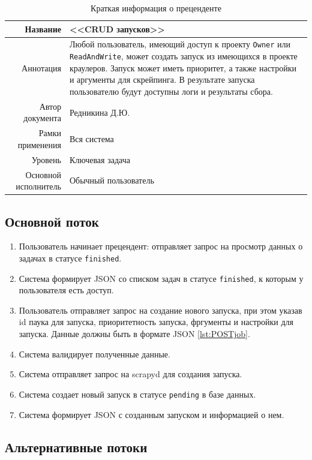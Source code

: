 \documentclass[a4paper,12pt]{article}
\begin{document}
	\begin{longtable}[]{|@{\textbf}r|p{7cm}|} 
    \caption{Краткая информация о преценденте}
    \hline
    Название             & <<CRUD запусков>>   \\ \hline
    Аннотация            & Любой пользователь, имеющий доступ к проекту \texttt{Owner} или \texttt{ReadAndWrite}, может создать запуск из имеющихся в проекте краулеров. Запуск может иметь приоритет, а также настройки и аргументы для скрейпинга. В результате запуска пользователю будут доступны логи и результаты сбора. \\ \hline
    Автор документа      & Редникина Д.Ю.     \\ \hline
    Рамки применения     & Вся система     \\ \hline
    Уровень              & Ключевая задача                     \\ \hline
    Основной исполнитель & Обычный пользователь     \\ \hline
\end{longtable}

\subsection*{Основной поток}

\begin{enumerate}
    \item Пользователь начинает прецендент: отправляет запрос на просмотр данных о задачах в статусе \texttt{finished}.
    \item Система формирует JSON со списком задач в статусе \texttt{finished}, к которым у пользователя есть доступ.
    \item Пользователь отправляет запрос на создание нового запуска, при этом указав id паука для запуска, приоритетность запуска, фргументы и настройки для запуска. Данные должны быть в формате JSON \ref{lst:POSTjob}. \label{g:createjob}
    \item Система валидирует полученные данные.
    \item Система отправляет запрос на scrapyd для создания запуска.
    \item Система создает новый запуск в статусе \texttt{pending} в базе данных.
    \item Система формирует JSON с созданным запуском и информацией о нем.
\end{enumerate}

\subsection*{Альтернативные потоки}
\end{document}
